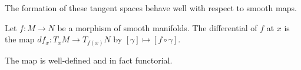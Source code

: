 The formation of these tangent spaces behave well with respect to smooth maps. 
\begin{definition}\label{def: differential of a smooth map}
    Let $f:M\to N$ be a morphism of smooth manifolds. The differential of $f$ at $x$ is the map $df_{x}:T_{x}M\to T_{f(x)}N$ by $[\gamma]\mapsto[f\circ\gamma]$. 
\end{definition}
\begin{remark}
    The map is well-defined and in fact functorial. 
\end{remark}